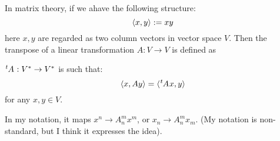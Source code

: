     In matrix theory, if we ahave the following structure:
    $$\braket{x,y} := x y$$
    here $x,y$ are regarded as two column vectors in vector space $V$.
    Then the transpose of a linear transformation $A:V\to V$ is defined
    as
    \begin{defi}[Transpose]
        $\tensor[^t]{A}{}:V^* \to V^*$ is such that:
        \begin{equation}
            \braket{x,Ay} = \braket{\tensor[^t]{A}{}x,y}
        \end{equation}
        for any $x,y\in V$.
    \end{defi}

    In my notation, it maps $x^n\to A^m_n x^m$, or $x_n\to A^m_n x_m$.
    (My notation is non-standard, but I think it expresses the idea).
